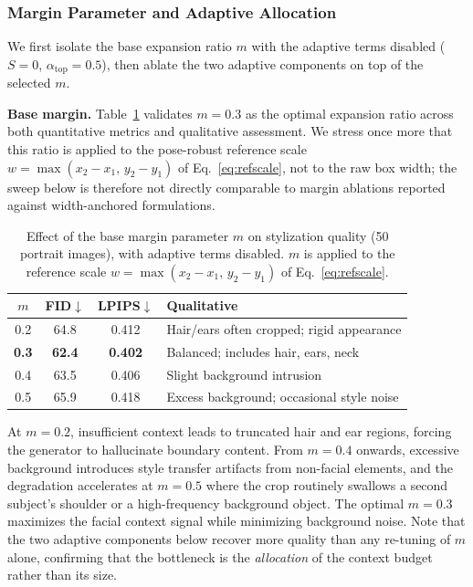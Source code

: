 \documentclass[journal]{IEEEtran}
\begin{document}
\subsubsection{Margin Parameter and Adaptive Allocation}
\label{subsec:ablation_margin}

We first isolate the base expansion ratio $m$ with the adaptive terms disabled ($S = 0$, $\alpha_{\text{top}} = 0.5$), then ablate the two adaptive components on top of the selected $m$.

\textbf{Base margin.} Table~\ref{tab:margin} validates $m = 0.3$ as the optimal expansion ratio across both quantitative metrics and qualitative assessment. We stress once more that this ratio is applied to the pose-robust reference scale $w = \max(x_2-x_1,\, y_2-y_1)$ of Eq.~\eqref{eq:refscale}, not to the raw box width; the sweep below is therefore not directly comparable to margin ablations reported against width-anchored formulations.

\begin{table}[t]
\caption{Effect of the base margin parameter $m$ on stylization quality (50 portrait images), with adaptive terms disabled. $m$ is applied to the reference scale $w = \max(x_2-x_1,\, y_2-y_1)$ of Eq.~\eqref{eq:refscale}.}
\label{tab:margin}
\centering
\begin{tabular}{cccp{3.2cm}}
\toprule
$m$ & \textbf{FID}$\downarrow$ & \textbf{LPIPS}$\downarrow$ & \textbf{Qualitative} \\
\midrule
0.2 & 64.8 & 0.412 & Hair/ears often cropped; rigid appearance \\
\textbf{0.3} & \textbf{62.4} & \textbf{0.402} & Balanced; includes hair, ears, neck \\
0.4 & 63.5 & 0.406 & Slight background intrusion \\
0.5 & 65.9 & 0.418 & Excess background; occasional style noise \\
\bottomrule
\end{tabular}
\end{table}

At $m = 0.2$, insufficient context leads to truncated hair and ear regions, forcing the generator to hallucinate boundary content. From $m = 0.4$ onwards, excessive background introduces style transfer artifacts from non-facial elements, and the degradation accelerates at $m = 0.5$ where the crop routinely swallows a second subject's shoulder or a high-frequency background object. The optimal $m = 0.3$ maximizes the facial context signal while minimizing background noise. Note that the two adaptive components below recover more quality than any re-tuning of $m$ alone, confirming that the bottleneck is the \textit{allocation} of the context budget rather than its size.
\end{document}
